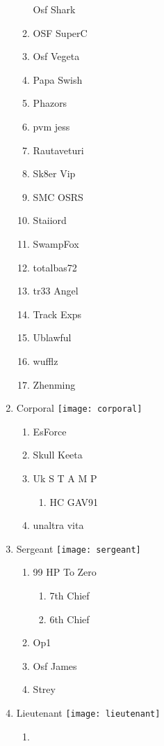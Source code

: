 \documentclass{article}
\begin{document}
\begin{enumerate}[I]
\begin{enumerate}[I]
	Osf Shark
      \item
	OSF SuperC
      \item
	Osf Vegeta
      \item
	Papa Swish
      \item
	Phazors
      \item
	pvm jess
      \item
	Rautaveturi
      \item
	Sk8er Vip
      \item
	SMC OSRS
      \item
	Staiiord
      \item
	SwampFox
      \item
	totalbas72
      \item
	tr33 Angel
      \item
	Track Exps
      \item
	Ublawful
      \item
	wufflz
      \item
	Zhenming
    \end{enumerate}
  \item
    Corporal \texttt{[image: corporal]}
    \begin{enumerate}[I]
      \item
	EsForce
      \item
	Skull Keeta
      \item
	Uk S T A M P
	\begin{enumerate}[I]
	  \item
	    HC GAV91
	\end{enumerate}
      \item
	unaltra vita
    \end{enumerate}
  \item
    Sergeant \texttt{[image: sergeant]}
    \begin{enumerate}[I]
      \item 
	99 HP To Zero
	\begin{enumerate}[I]
	  \item
	    7th Chief
	  \item
	    6th Chief
	\end{enumerate}
      \item
	Op1
      \item
	Osf James
      \item
	Strey
    \end{enumerate}
  \item
    Lieutenant \texttt{[image: lieutenant]}
    \begin{enumerate}[I]
      \item

\end{enumerate}
\end{enumerate}
\end{document}
